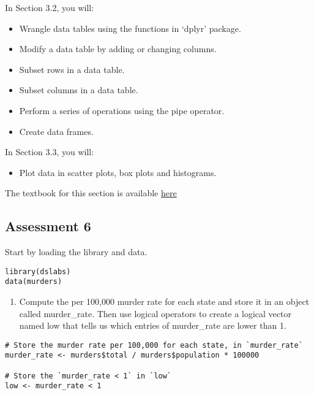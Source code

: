 \documentclass[
]{article}
\providecommand{\tightlist}{%
  \setlength{\itemsep}{0pt}\setlength{\parskip}{0pt}}
\begin{document}
In Section 3.2, you will:

\begin{itemize}
\tightlist
\item
  Wrangle data tables using the functions in `dplyr' package.
\item
  Modify a data table by adding or changing columns.
\item
  Subset rows in a data table.
\item
  Subset columns in a data table.
\item
  Perform a series of operations using the pipe operator.
\item
  Create data frames.
\end{itemize}

In Section 3.3, you will:

\begin{itemize}
\tightlist
\item
  Plot data in scatter plots, box plots and histograms.
\end{itemize}

The textbook for this section is available
\href{https://rafalab.github.io/dsbook/r-basics.html\#indexing}{here}

\hypertarget{assessment-6}{%
\subsection{Assessment 6}\label{assessment-6}}

Start by loading the library and data.

\begin{verbatim}
library(dslabs)
data(murders)
\end{verbatim}

\begin{enumerate}
\def\labelenumi{\arabic{enumi}.}
\tightlist
\item
  Compute the per 100,000 murder rate for each state and store it in an
  object called murder\_rate. Then use logical operators to create a
  logical vector named low that tells us which entries of murder\_rate
  are lower than 1.
\end{enumerate}

\begin{verbatim}
# Store the murder rate per 100,000 for each state, in `murder_rate`
murder_rate <- murders$total / murders$population * 100000

# Store the `murder_rate < 1` in `low` 
low <- murder_rate < 1
\end{verbatim}
\end{document}
